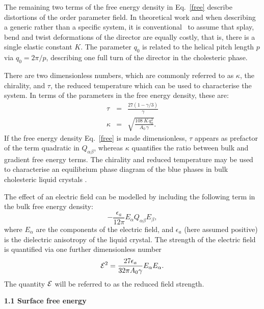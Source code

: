 \documentclass[12pt,twoside]{article}
\begin{document}
The remaining two terms of the free energy density in Eq.~\ref{free} describe
distortions of the order parameter field. In theoretical work and when
describing a generic rather than a specific system, it is 
conventional~\cite{blue1,deGennes} to
assume that splay, bend and twist deformations of the director are equally
costly, that is, there is a single elastic constant $K$. The parameter $q_0$
is related to the helical pitch length $p$ via $q_0=2\pi/p$,
describing one full turn of the director in the cholesteric phase.

There are two dimensionless numbers, which are commonly referred to as
$\kappa$, the chirality, and  $\tau$, the reduced temperature
\cite{blue1} which can be used to characterise the system. In terms of
the parameters in the free energy density, these are:
\begin{eqnarray}\label{cntrl-param} 
\tau&=&\frac{27(1-\gamma/3)}{\gamma}\label{tau}\\
\kappa&=&\sqrt{\frac{108\ K\, q_0^2}{A_0\, \gamma}}\label{kappa}.
\end{eqnarray}
If the free energy density Eq.~\ref{free} is made dimensionless, $\tau$
appears as prefactor of the term  quadratic in $Q_{\alpha\beta}$,
whereas $\kappa$
quantifies the ratio between bulk and  gradient free energy terms. The
chirality and reduced temperature may be used to characterise an equilibrium
phase diagram of the blue phases in bulk cholesteric liquid crystals
\cite{blue1,oliver1}.

The effect of an electric field can be modelled by including the following
term in the bulk free energy density:
\begin{equation}
-\frac{\epsilon_a}{12\pi} E_{\alpha}Q_{\alpha\beta}E_{\beta},
\end{equation} 
where $E_{\alpha}$ are the components of the electric field, and 
$\epsilon_a$ (here assumed positive) is the dielectric anisotropy of the liquid
crystal. The strength of the electric field is quantified via
one further dimensionless number
\begin{equation}
{\cal E}^2 = \frac{27 \epsilon_a}{32 \pi A_0 \gamma} E_\alpha E_\alpha.
\end{equation}
The quantity ${\cal E}$ will be referred to as the reduced field strength.

{\bf 1.1 Surface free energy}
\end{document}
